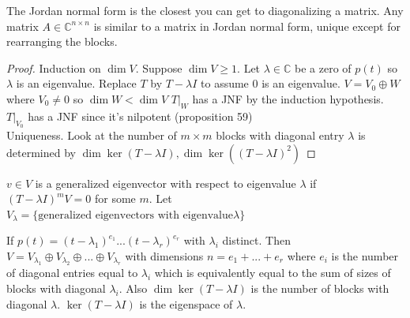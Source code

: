 \documentclass{article}
\newcommand{\C}{\mathbb{C}}
\begin{document}
The Jordan normal form is the closest you can get to diagonalizing a matrix. Any matrix $A\in \C^{n\times n}$ is similar to a matrix in Jordan normal form, unique except for rearranging the blocks. 
\begin{proof}
Induction on $\dim V$. Suppose $\dim V\geq 1$. Let $\lambda\in \C$ be a zero of $p(t)$ so $\lambda$ is an eigenvalue. Replace $T$ by $T-\lambda I$ to assume $0$ is an eigenvalue. $V=V_0\oplus W$ where $V_0\neq 0$ so $\dim W<\dim V$ $T|_W$ has a JNF by the induction hypothesis. $T|_{V_0}$ has a JNF since it's nilpotent (proposition 59) \\
Uniqueness. Look at the number of $m\times m$ blocks with diagonal entry $\lambda$ is determined by $\dim\ker(T-\lambda I), \dim\ker((T-\lambda I)^2)$
\end{proof}
\begin{definition}
$v\in V$ is a generalized eigenvector with respect to eigenvalue $\lambda$ if $(T-\lambda I)^m V=0$ for some $m$. Let $V_\lambda =\{\textrm{generalized eigenvectors with eigenvalue}\lambda\}$
\end{definition}
\begin{corollary}
If $p(t)=(t-\lambda_1)^{e_1}...(t-\lambda_r)^{e_r}$ with $\lambda_i$ distinct. Then $V=V_{\lambda_1}\oplus V_{\lambda_2}\oplus...\oplus V_{\lambda_r}$ with dimensions $n=e_1+...+e_r$ where $e_i$ is the number of diagonal entries equal to $\lambda_i$ which is equivalently equal to the sum of sizes of blocks with diagonal $\lambda_i$. Also $\dim\ker(T-\lambda I)$ is the number of blocks with diagonal $\lambda$. $\ker(T-\lambda I)$ is the eigenspace of $\lambda$. 
\end{corollary}
\end{document}
